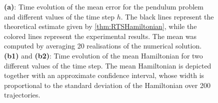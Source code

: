 \documentclass[10pt]{article}
\begin{document}
\begin{figure}[th!]
\begin{center}
\begin{subfigure}{\linewidth}
\begin{subfigure}{0.2\linewidth}
	\end{subfigure}
	\end{subfigure}
	\end{center}
	\caption{\textbf{(a)}: Time evolution of the mean error for the pendulum problem and different values of the time step $h$. The black lines represent the theoretical estimate given by \cref{thm:RTSHamiltonian}, while the colored lines represent the experimental results. The mean was computed {by} averaging 20 realisations of the numerical solution. {\textbf{(b1)} and \textbf{(b2)}: Time evolution of the mean  Hamiltonian for two different values of the time step. The mean Hamiltonian is depicted together with an approximate confidence interval, whose width is proportional to the standard deviation of the Hamiltonian over 200 trajectories.}}
	\label{fig:MeanTime}
\end{figure}
\end{document}
